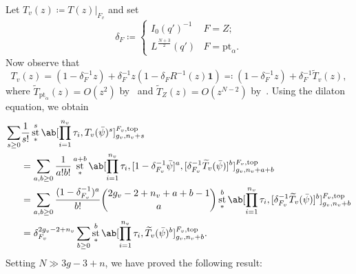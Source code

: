 \documentclass[10pt]{amsart}
\theoremstyle{definition}
\theoremstyle{remark}
\theoremstyle{plain}
\theoremstyle{definition}
\theoremstyle{remark}
\newcommand{\mr}[1]{\mathrm{#1}}
\newcommand{\wt}[1]{\widetilde{#1}}
\newcommand{\1}{\mathbf{1}}
\newcommand{\2}{\mathbf{2}}
\newcommand{\3}{\mathbf{3}}
\newcommand{\pt}{\mr{pt}}
\renewcommand{\top}{\mr{top}}
\DeclareMathOperator{\st}{st}
\numberwithin{equation}{section}
\begin{document}
Let $T_v(z) \coloneqq T(z)|_{F_v}$ and set
\[ \delta_F \coloneqq \begin{cases}
    I_0(q')^{-1} & F=Z; \\
    L^{\frac{N+3}{2}}(q') & F = \pt_{\alpha}.
\end{cases}
\]
Now observe that 
\[ T_v(z) = (1-\delta_F^{-1}z) + \delta_F^{-1}z(1-\delta_F R^{-1}(z) \1) \eqqcolon (1-\delta_F^{-1}z) + \delta_F^{-1} \wt{T}_v(z), \]
where $\wt{T}_{\pt_{\alpha}}(z) = O(z^2)$ by~ and $\wt{T}_{Z}(z) = O(z^{N-2})$ by~. Using the dilaton equation, we obtain
\begin{align*}
    \sum_{s \geq 0}& \frac{1}{s!} \st^s_* \ab[\prod_{i=1}^{n_v} \tau_i, T_v(\bar{\psi})^s]_{g_v, n_v+s}^{F_v, \top} \\
    &= \sum_{a,b \geq 0} \frac{1}{a!b!} \st^{a+b}_* \ab[\prod_{i=1}^{n_v} \tau_i, [1-\delta_{F_v}^{-1}\bar{\psi}]^a,[\delta_{F_v}^{-1}\wt{T}_v(\bar{\psi})]^b]_{g_v, n_v+a+b}^{F_v, \top} \\
    &= \sum_{a,b\geq 0} \frac{(1-\delta_{F_v}^{-1})^a}{b!} \binom{2g_v-2+n_v+a+b-1}{a} \st^b_* \ab[\prod_{i=1}^{n_v} \tau_i, [\delta_{F_v}^{-1} \wt{T}_v(\bar{\psi})]^b]_{g_v, n_v+b}^{F_v, \top} \\
    &= \delta_{F_v}^{2g_v-2+n_v} \sum_{b \geq 0} \st^b_* \ab[\prod_{i=1}^{n_v} \tau_i, \wt{T}_v(\bar{\psi})^b]_{g_v, n_v+b}^{F_v, \top}.
\end{align*}
Setting $N \gg 3g-3+n$, we have proved the following result:
\end{document}
